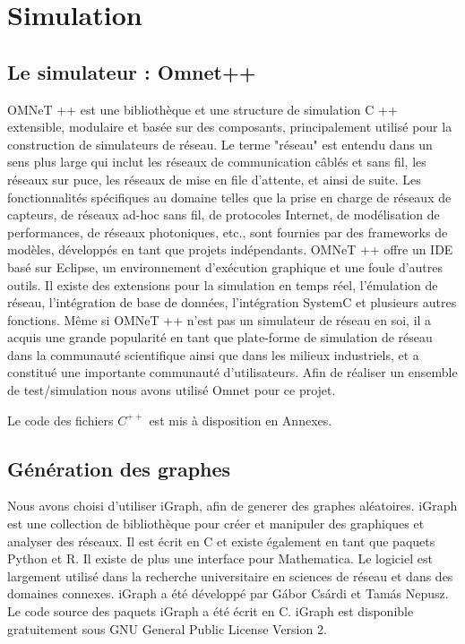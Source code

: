 \newpage
\chapter{Simulation}

\section{Le simulateur : Omnet++}
OMNeT ++ est une bibliothèque et une structure de simulation C ++ extensible, modulaire et basée sur des composants, principalement utilisé pour la construction de simulateurs de réseau. Le terme "réseau" est entendu dans un sens plus large qui inclut les réseaux de communication câblés et sans fil, les réseaux sur puce, les réseaux de mise en file d'attente, et ainsi de suite. Les fonctionnalités spécifiques au domaine telles que la prise en charge de réseaux de capteurs, de réseaux ad-hoc sans fil, de protocoles Internet, de modélisation de performances, de réseaux photoniques, etc., sont fournies par des frameworks de modèles, développés en tant que projets indépendants. OMNeT ++ offre un IDE basé sur Eclipse, un environnement d'exécution graphique et une foule d'autres outils. Il existe des extensions pour la simulation en temps réel, l'émulation de réseau, l'intégration de base de données, l'intégration SystemC et plusieurs autres fonctions.
Même si OMNeT ++ n'est pas un simulateur de réseau en soi, il a acquis une grande popularité en tant que plate-forme de simulation de réseau dans la communauté scientifique ainsi que dans les milieux industriels, et a constitué une importante communauté d'utilisateurs.
Afin de réaliser un ensemble de test/simulation nous avons utilisé Omnet pour ce projet.

Le code des fichiers $C^{++}$ est mis à disposition en Annexes.
\section{Génération des graphes}
Nous avons choisi d'utiliser iGraph, afin de generer des graphes aléatoires.
iGraph est une collection de bibliothèque pour créer et manipuler des graphiques et analyser des réseaux. Il est écrit en C et existe également en tant que paquets Python et R. Il existe de plus une interface pour Mathematica. Le logiciel est largement utilisé dans la recherche universitaire en sciences de réseau et dans des domaines connexes.
iGraph a été développé par Gábor Csárdi et Tamás Nepusz. Le code source des paquets iGraph a été écrit en C. iGraph est disponible gratuitement sous GNU General Public License Version 2.

